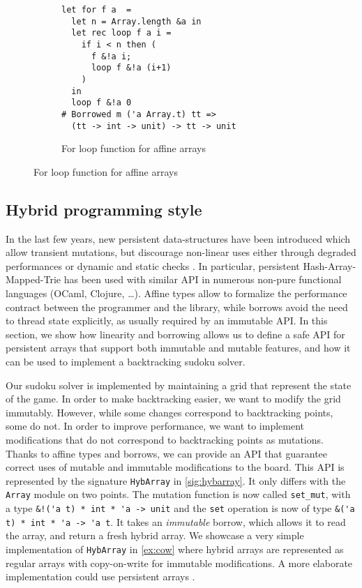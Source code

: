 \begin{figure}
  \centering
  \begin{subfigure}{0.5\linewidth}
\begin{lstlisting}
let for f a  = 
  let n = Array.length &a in
  let rec loop f a i = 
    if i < n then (
      f &!a i;
      loop f &!a (i+1)
    )
  in
  loop f &!a 0
# Borrowed m ('a Array.t) tt =>
  (tt -> int -> unit) -> tt -> unit
\end{lstlisting}
    \caption{For loop function for affine arrays}
    \label{ex:array}
  \end{subfigure}
\end{figure}

\subsection{Hybrid programming style}

In the last few years, new persistent data-structures
have been introduced which allow transient mutations, but discourage
non-linear uses either through degraded performances
\cite{DBLP:conf/ml/ConchonF07} or
dynamic and static checks \cite{DBLP:journals/pacmpl/Puente17}.
In particular, persistent Hash-Array-Mapped-Trie has been used with similar
API in numerous non-pure functional languages (OCaml, Clojure, \dots).
Affine types allow to formalize the performance contract between the programmer
and the library, while borrows avoid the need to thread state explicitly,
as usually required by an immutable API.
%
In this section, we show how linearity and borrowing allows us to define
a safe API for persistent arrays that support both immutable and mutable features,
and how it can be used to implement a backtracking sudoku solver.

Our sudoku solver is implemented by maintaining a grid that represent the state of the game. In order to make backtracking easier, we want to modify the grid immutably. However, while some changes correspond to backtracking points,
some do not.
In order to improve performance, we want to implement modifications
that do not correspond to backtracking points as mutations.
Thanks to affine types and borrows, we can provide an API that guarantee correct
uses of mutable and immutable modifications to the board.
This API is represented by the signature \lstinline/HybArray/ in \cref{sig:hybarray}.
It only differs with the \lstinline/Array/ module on two points.
The mutation function is now called \lstinline/set_mut/, with
a type \lstinline/&!('a t) * int * 'a -> unit/ and
the \lstinline/set/ operation
is now of type \lstinline/&('a t) * int * 'a -> 'a t/. It
takes an \emph{immutable} borrow, which allows it to read the array, and
return a fresh hybrid array.
We showcase a very simple implementation of \lstinline/HybArray/ in
\cref{ex:cow} where hybrid arrays are represented
as regular arrays with copy-on-write for immutable
modifications.
A more elaborate implementation could use persistent arrays
\cite{DBLP:conf/ml/ConchonF07}.


